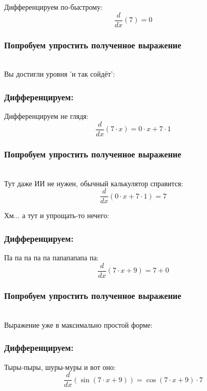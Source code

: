 \documentclass[a4paper,12pt]{article}
\begin{document}
Дифференцируем по-быстрому:
\begin{dmath}\frac{d}{dx}\left(7\right)=0\end{dmath}
\subsubsection*{Попробуем упростить полученное выражение}
\\Вы достигли уровня 'и так сойдёт':

\subsubsection*{Дифференцируем:}

Дифференцируем не глядя:
\begin{dmath}\frac{d}{dx}\left(7\cdot x\right)=0\cdot x+ 7\cdot 1\end{dmath}
\subsubsection*{Попробуем упростить полученное выражение}
\\Тут даже ИИ не нужен, обычный калькулятор справится:\\
\begin{dmath}
	\frac{d}{dx}\left(0\cdot x+ 7\cdot 1\right) = 7\end{dmath}

Хм... а тут и упрощать-то нечего:

\subsubsection*{Дифференцируем:}

Па па па па па папапапапа па:
\begin{dmath}\frac{d}{dx}\left(7\cdot x+ 9\right)=7+ 0\end{dmath}
\subsubsection*{Попробуем упростить полученное выражение}
\\Выражение уже в максимально простой форме:

\subsubsection*{Дифференцируем:}

Тыры-пыры, шуры-муры и вот оно:
\begin{dmath}\frac{d}{dx}\left(\operatorname{sin}\left(7\cdot x+ 9\right) \right)=\operatorname{cos}\left(7\cdot x+ 9\right) \cdot 7\end{dmath}
\end{document}
